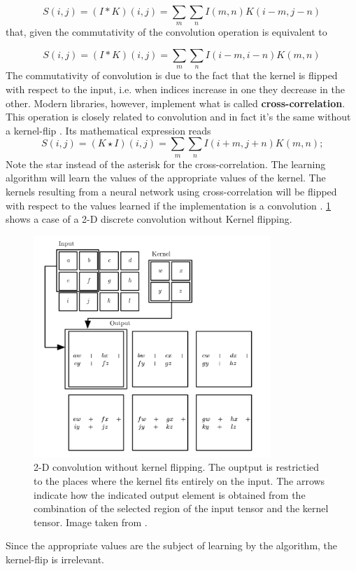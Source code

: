 \begin{equation}
    S(i,j) = (I \ast K) (i,j) = \sum_m \sum_n I(m,n)K(i-m,j-n)
\label{2equ:7}
\end{equation}
that, given the commutativity of the convolution operation is equivalent to

\begin{equation}
    S(i,j) = (I \ast K) (i,j) = \sum_m \sum_n I(i-m,i-n)K(m,n)
\label{2equ:8}
\end{equation}
The commutativity of convolution is due to the fact that the kernel is flipped with respect to the input, i.e. when indices increase in one they decrease in the other. Modern libraries, however, implement what is called \textbf{cross-correlation}. This operation is closely related to convolution and in fact it's the same without a kernel-flip \citep{Goodfellow2016}. Its mathematical expression reads
\begin{equation}
    S(i,j) = (K \star I)(i,j) = \sum_m \sum_n I(i+m,j+n)K(m,n)\text{;}
\label{2equ:9}
\end{equation}
Note the star instead of the asterisk for the cross-correlation.
The learning algorithm will learn the values of the appropriate values of the kernel. The kernels resulting from a neural network using cross-correlation will be flipped with respect to the values learned if the implementation is a convolution \citep{Goodfellow2016}. \cref{fig:ConvExample} shows a case of a 2-D discrete convolution without Kernel flipping.

\begin{figure}[h!]
    \centering
    \includegraphics[width=0.8\textwidth]{ConvExample.png}
    \caption{2-D convolution without kernel flipping. The ouptput is restrictied to the places where the kernel fits entirely on the input. The arrows indicate how the indicated output element is obtained from the combination of the selected region of the input tensor and the kernel tensor. Image taken from \citet{Goodfellow2016}.}
    \label{fig:ConvExample}
\end{figure}
Since the appropriate values are the subject of learning by the algorithm, the kernel-flip is irrelevant.

